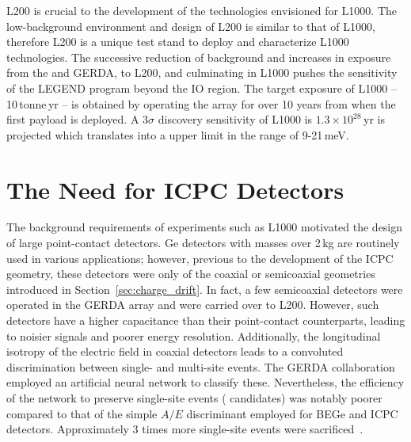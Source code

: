 L200 is crucial to the development of the technologies envisioned for L1000. The low-background environment and design of L200 is similar to that of L1000, therefore L200 is a unique test stand to deploy and characterize L1000 technologies. The successive reduction of background and increases in exposure from the {\MJDEMit} and GERDA, to L200, and culminating in L1000 pushes the sensitivity of the LEGEND program beyond the IO region. The target exposure of L1000 -- 10\,tonne\,yr -- is obtained by operating the array for over 10 years from when the first payload is deployed. A 3$\sigma$ \novbb{} discovery sensitivity of L1000 is $1.3\times10^{28}$\,yr is projected which translates into a \mbb{} upper limit in the range of 9-21\,meV.

\section{The Need for ICPC Detectors}

The background requirements of experiments such as L1000 motivated the design of large point-contact detectors. Ge detectors with masses over 2\,kg are routinely used in various applications; however, previous to the development of the ICPC geometry, these detectors were only of the coaxial or semicoaxial geometries introduced in Section~\ref{sec:charge_drift}. In fact, a few semicoaxial detectors were operated in the GERDA array and were carried over to L200. However, such detectors have a higher capacitance than their point-contact counterparts, leading to noisier signals and poorer energy resolution. Additionally, the longitudinal isotropy of the electric field in coaxial detectors leads to a convoluted discrimination between single- and multi-site events. The GERDA collaboration employed an artificial neural network to classify these. Nevertheless, the efficiency of the network to preserve single-site events (\novbb{} candidates) was notably poorer compared to that of the simple $A/E$ discriminant employed for BEGe and ICPC detectors. Approximately 3 times more single-site events were sacrificed~\cite{GERDA2020}. 

